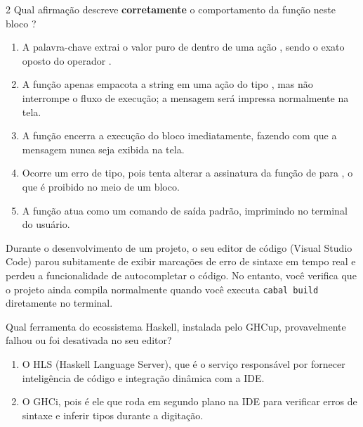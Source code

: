 \documentclass[a4paper,10pt,brazil]{article}
\begin{document}
\begin{multicols}{2}
Qual afirmação descreve \textbf{corretamente} o comportamento da função  neste bloco ?

\begin{enumerate}
  \item A palavra-chave  extrai o valor puro de dentro de uma ação , sendo o exato oposto do operador \haskellinline{<-}.

  \item A função  apenas empacota a string em uma ação do tipo , mas não interrompe o fluxo de execução; a mensagem  será impressa normalmente na tela.

  \item A função  encerra a execução do bloco  imediatamente, fazendo com que a mensagem  nunca seja exibida na tela.

  \item Ocorre um erro de tipo, pois  tenta alterar a assinatura da função de  para , o que é proibido no meio de um bloco.

  \item A função  atua como um comando de saída padrão, imprimindo  no terminal do usuário.


\end{enumerate}

Durante o desenvolvimento de um projeto, o seu editor de código (Visual Studio Code) parou subitamente de exibir marcações de erro de sintaxe em tempo real e perdeu a funcionalidade de autocompletar o código. No entanto, você verifica que o projeto ainda compila normalmente quando você executa \texttt{cabal build} diretamente no terminal. 

Qual ferramenta do ecossistema Haskell, instalada pelo GHCup, provavelmente falhou ou foi desativada no seu editor?

\begin{enumerate}
  \item O HLS (Haskell Language Server), que é o serviço responsável por fornecer inteligência de código e integração dinâmica com a IDE.

  \item O GHCi, pois é ele que roda em segundo plano na IDE para verificar erros de sintaxe e inferir tipos durante a digitação.


\end{enumerate}
\end{multicols}
\end{document}
